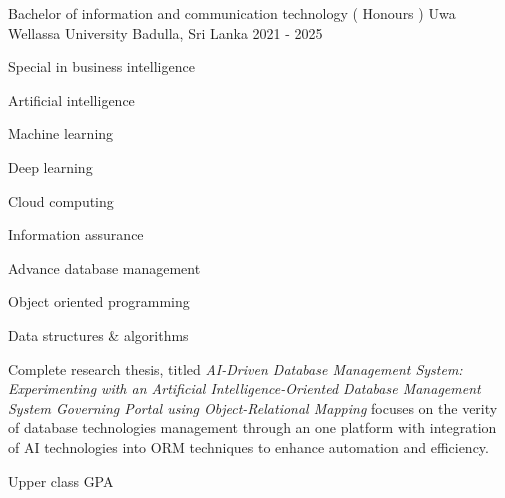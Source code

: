 

\begin{cventries}

  \cventry
    {Bachelor of information and communication technology ( Honours )} %
    {Uwa Wellassa University} %
    {Badulla, Sri Lanka} %
    {2021 - 2025} %
    {
      \begin{cvitems} %
        \item {Special in business intelligence }
        \item {Artificial intelligence}
        \item {Machine learning}
        \item {Deep learning}
        \item {Cloud computing}
        \item {Information assurance }
        \item {Advance database management}
        \item {Object oriented programming}
        \item {Data structures  &  algorithms}
        \item {Complete research thesis, titled \textit{AI-Driven Database Management System: Experimenting with an Artificial Intelligence-Oriented Database Management System Governing Portal using Object-Relational Mapping} focuses on the verity of database technologies management through an one platform with integration of AI technologies into ORM techniques to enhance automation and efficiency.}
        \item {Upper class GPA}
      \end{cvitems}
    }

\end{cventries}
